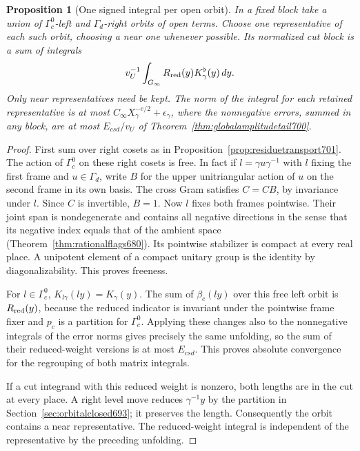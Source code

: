 \documentclass[a4paper,11pt]{article}
\newtheorem{proposition}{Proposition}[section]
\theoremstyle{definition}
\theoremstyle{remark}
\numberwithin{equation}{section}
\begin{document}
\begin{proposition}[One signed integral per open orbit]\leavevmode
\label{prop:unfoldopen702}
In a fixed block take a union of
\(\Gamma_c^0\)-left and \(\Gamma_d\)-right orbits of open terms.
Choose one representative of each such orbit, choosing a near
one whenever possible. Its normalized cut block is a sum of
integrals
\[
       v_U^{-1}\int_{G_\infty}R_{\rm red}(y)K_\gamma^\flat(y)\,dy .
\]
Only near representatives need be kept. The norm of the
integral for each retained representative is at most
\(C_\infty X_\gamma^{-e/2}+\epsilon_\gamma\), where the
nonnegative errors, summed in any block, are at most
\(E_{csd}/v_U\) of Theorem~\ref{thm:globalamplitudetail700}.
\end{proposition}
\begin{proof}
First sum over right cosets as in
Proposition~\ref{prop:residuetransport701}. The action of
\(\Gamma_c^0\) on these right cosets is free. In fact if
\(l=\gamma u\gamma^{-1}\) with \(l\) fixing the first frame
and \(u\in\Gamma_d\), write \(B\) for the upper unitriangular
action of \(u\) on the second frame in its own basis. The
cross Gram satisfies \(C=CB\), by invariance under \(l\).
Since \(C\) is invertible, \(B=1\). Now \(l\) fixes both frames
pointwise. Their joint span is nondegenerate and contains
all negative directions in the sense that its negative index
equals that of the ambient space
(Theorem~\ref{thm:rationalflags680}). Its pointwise stabilizer
is compact at every real place. A unipotent element of a
compact unitary group is the identity by diagonalizability.
This proves freeness.

For \(l\in\Gamma_c^0\), \(K_{l\gamma}(ly)=K_\gamma(y)\).
The sum of \(\beta_c(ly)\) over this free left orbit is
\(R_{\rm red}(y)\), because the reduced indicator is invariant
under the pointwise frame fixer and \(p_c\) is a partition
for \(\Gamma_c^0\). Applying these changes also to the
nonnegative integrals of the error norms gives precisely the
same unfolding, so the sum of their reduced-weight versions
is at most \(E_{csd}\). This proves absolute convergence for
the regrouping of both matrix integrals.

If a cut integrand with this reduced weight is nonzero,
both lengths are in the cut at every place. A right level
move reduces \(\gamma^{-1}y\) by the partition in
Section~\ref{sec:orbitalclosed693}; it preserves the length.
Consequently the orbit contains a near representative. The
reduced-weight integral is independent of the representative
by the preceding unfolding.


\end{proof}
\end{document}
